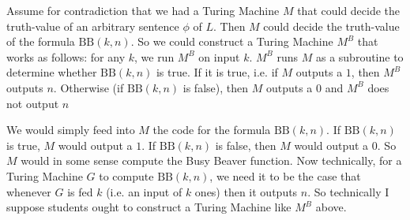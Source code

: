 \documentclass[12pt,a4paper]{article}
\begin{document}
\begin{enumerate}
{Assume for contradiction that we had a Turing Machine $M$ that could decide the truth-value of an arbitrary sentence $\phi$ of $L$. Then $M$ could decide the truth-value of the formula \(\mbox{BB}(k,n)\). So we could construct a Turing Machine $M^B$ that works as follows: for any $k$, we run $M^B$ on input $k$. $M^B$ runs $M$ as a subroutine to determine whether \(\mbox{BB}(k,n)\) is true. If it is true, i.e. if $M$ outputs a $1$, then $M^B$ outputs $n$. Otherwise (if \(\mbox{BB}(k,n)\) is false), then $M$ outputs a $0$ and $M^B$ does not output $n$


We would simply feed into $M$ the code for the formula \(\mbox{BB}(k,n)\). If  \(\mbox{BB}(k,n)\) is true, $M$ would output a $1$. If \(\mbox{BB}(k,n)\) is false, then $M$ would output a $0$. So $M$ would in some sense compute the Busy Beaver function. Now technically, for a Turing Machine $G$ to compute \(\mbox{BB}(k,n)\), we need it to be the case that whenever $G$ is fed $k$ (i.e. an input of $k$ ones) then it outputs $n$. So technically I suppose students ought to construct a Turing Machine like $M^B$ above. 

\fi 
  
}




  
  \end{enumerate} 
\end{document}
